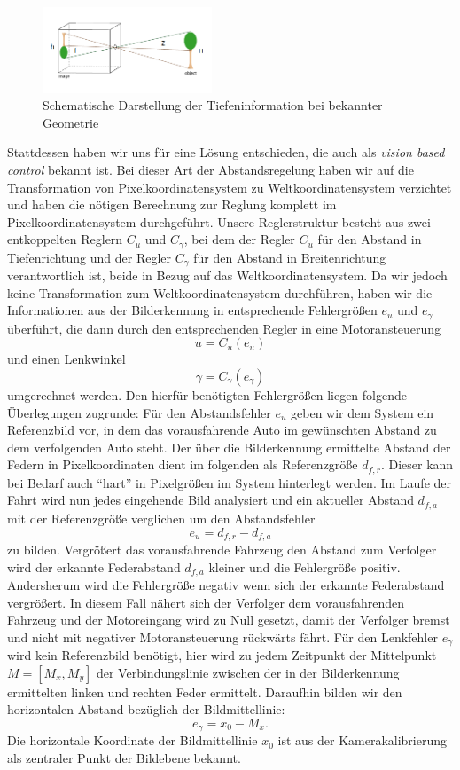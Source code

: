 \documentclass[10pt]{article}
\begin{document}
    \begin{figure}[hbtp]
        \centering
        \includegraphics[width=0.45\textwidth]{Pinholeobject_label}
        \caption{Schematische Darstellung der Tiefeninformation bei bekannter Geometrie}\label{fig:reifenradius}
    \end{figure}
    Stattdessen haben wir uns für eine Lösung entschieden, die auch als \textit{vision based control} bekannt ist.
    Bei dieser Art der Abstandsregelung haben wir auf die Transformation von Pixelkoordinatensystem zu Weltkoordinatensystem verzichtet und haben die nötigen Berechnung zur Reglung komplett im Pixelkoordinatensystem durchgeführt.
    Unsere Reglerstruktur besteht aus zwei entkoppelten Reglern $C_u$ und $C_{\gamma}$, bei dem der Regler $C_u$ für den Abstand in Tiefenrichtung und der Regler $C_{\gamma}$ für den Abstand in Breitenrichtung verantwortlich ist, beide in Bezug auf das Weltkoordinatensystem.
    Da wir jedoch keine Transformation zum Weltkoordinatensystem durchführen, haben wir die Informationen aus der Bilderkennung in entsprechende Fehlergrößen $e_u$ und $e_{\gamma}$ überführt, die dann durch den entsprechenden Regler in eine Motoransteuerung \[u = C_u(e_u)\] und einen Lenkwinkel \[\gamma = C_{\gamma}(e_{\gamma})\] umgerechnet werden.
    Den hierfür benötigten Fehlergrößen liegen folgende Überlegungen zugrunde:
    Für den Abstandsfehler $e_u$ geben wir dem System ein Referenzbild vor, in dem das vorausfahrende Auto im gewünschten Abstand zu dem verfolgenden Auto steht.
    Der über die Bilderkennung ermittelte Abstand der Federn in Pixelkoordinaten dient im folgenden als Referenzgröße $d_{f,r}$.
    Dieser kann bei Bedarf auch \enquote{hart} in Pixelgrößen im System hinterlegt werden.
    Im Laufe der Fahrt wird nun jedes eingehende Bild analysiert und ein aktueller Abstand $d_{f,a}$ mit der Referenzgröße verglichen um den Abstandsfehler \[
    e_u = d_{f,r} -d_{f,a}
    \] zu bilden.
    Vergrößert das vorausfahrende Fahrzeug den Abstand zum Verfolger wird der erkannte Federabstand $ d_{f,a}$ kleiner und die Fehlergröße positiv.
    Andersherum wird die Fehlergröße negativ wenn sich der erkannte Federabstand vergrößert.
    In diesem Fall nähert sich der Verfolger dem vorausfahrenden Fahrzeug und der Motoreingang wird zu Null gesetzt, damit der Verfolger bremst und nicht mit negativer Motoransteuerung rückwärts fährt.
    Für den Lenkfehler $e_{\gamma}$ wird kein Referenzbild benötigt, hier wird zu jedem Zeitpunkt der Mittelpunkt $M=\left[M_x, M_y\right]$ der Verbindungslinie zwischen der in der Bilderkennung ermittelten linken und rechten Feder ermittelt.
    Daraufhin bilden wir den horizontalen Abstand bezüglich der Bildmittellinie: \[
    e_{\gamma} = x_0 - M_x.
    \]
    Die horizontale Koordinate der Bildmittellinie $x_0$ ist aus der Kamerakalibrierung als zentraler Punkt der Bildebene bekannt.
\end{document}
